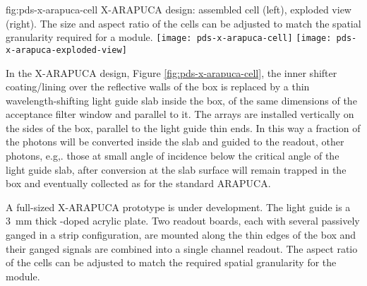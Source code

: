 \begin{dunefigure}{fig:pds-x-arapuca-cell}
{X-ARAPUCA design: assembled cell (left),  exploded view (right). The size and aspect ratio of the cells can be adjusted to match the spatial granularity required for a  module.}
  \texttt{[image: pds-x-arapuca-cell]}
  \texttt{[image: pds-x-arapuca-exploded-view]}
\end{dunefigure}


In the X-ARAPUCA design, Figure \ref{fig:pds-x-arapuca-cell}, the inner shifter coating/lining over the reflective walls of the box is replaced by a thin wavelength-shifting light guide slab inside the box, of the same dimensions of the acceptance filter window and parallel to it. The  arrays are installed vertically on the sides of the box, parallel to the light guide thin ends. 
 In this way a fraction of the photons will be converted inside the slab and guided to the readout, other photons,  e.g,. those at small angle of incidence below the critical angle of the light guide slab, after conversion at the slab surface will remain trapped in the box and eventually collected as for the standard ARAPUCA.
 
 A full-sized X-ARAPUCA prototype is under development. The light guide is a \SI{3}{mm} thick -doped acrylic plate. Two readout boards, each with several passively ganged  in a strip configuration, are mounted along the thin edges of the box and their ganged signals are combined into a single channel readout. 
 The aspect ratio of the cells can be adjusted to match the required spatial granularity for the  module.
 
%
 
